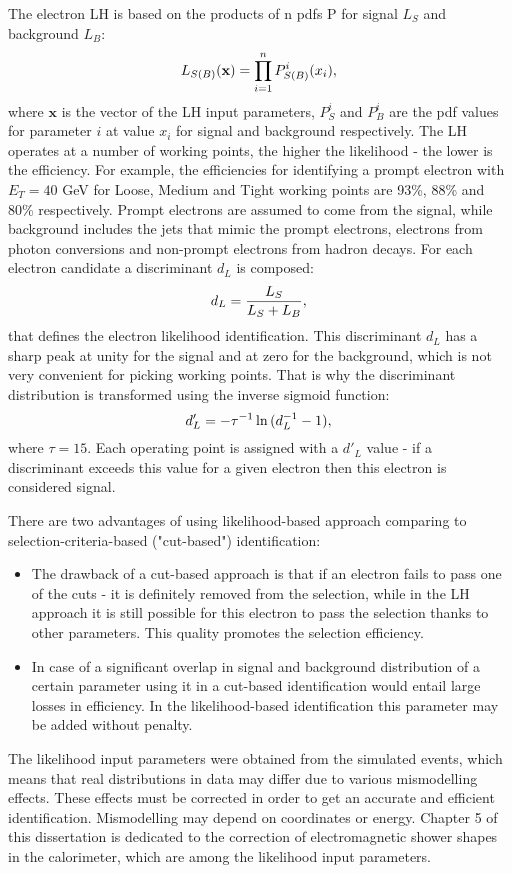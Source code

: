     The electron LH is based on the products of n \gls{pdfs} P for signal $L_S$ and background $L_B$:
    \begin{equation}
    L_{S(B)}(\textbf{x}) = \prod_{i=1}^n P^i_{S(B)}(x_i),\\
    \end{equation}
    where $\textbf{x}$ is the vector of the LH input parameters, $P^i_{S}$ and $P^i_{B}$ are the pdf values for parameter $i$ at value $x_i$ for signal and background respectively.
    The LH operates at a number of working points, the higher the likelihood - the lower is the efficiency. For example, the efficiencies for identifying a prompt electron with $E_T=40$ GeV for Loose, Medium and Tight working points are 93\%, 88\% and 80\% respectively. Prompt electrons are assumed to come from the signal, while background includes the jets that mimic the prompt electrons, electrons from photon conversions and non-prompt electrons from hadron decays. For each electron candidate a discriminant $d_L$ is composed:
     \begin{equation}
    d_L=\frac{L_S}{L_S+L_B},\\
    \end{equation}
    that defines the electron likelihood identification. This discriminant $d_L$ has a sharp peak at unity for the signal and at zero for the background, which is not very convenient for picking working points. That is why the discriminant distribution is transformed using the inverse sigmoid function:
     \begin{equation}
    d_L^{\prime}=-\tau^{-1}\ln{(d^{-1}_L-1)},\\
    \end{equation}
    where $\tau=15$. Each operating point is assigned with a $d'_L$ value - if a discriminant exceeds this value for a given electron then this electron is considered signal.
    
    There are two advantages of using likelihood-based approach comparing to selection-criteria-based ("cut-based") identification:
    \begin{itemize}
    	\item The drawback of a cut-based approach is that if an electron fails to pass one of the cuts - it is definitely removed from the selection, while in the LH approach it is still possible for this electron to pass the selection thanks to other parameters. This quality promotes the selection efficiency. 
    	\item In case of a significant overlap in signal and background distribution of a certain parameter using it in a cut-based identification would entail large losses in efficiency. In the likelihood-based identification this parameter may be added without penalty. 
	\end{itemize}
	The likelihood input parameters were obtained from the simulated events, which means that real distributions in data may differ due to various mismodelling effects. These effects must be corrected in order to get an accurate and efficient identification. Mismodelling may depend on coordinates or energy. Chapter 5 of this dissertation is dedicated to the correction of electromagnetic shower shapes in the calorimeter, which are among the likelihood input parameters.

